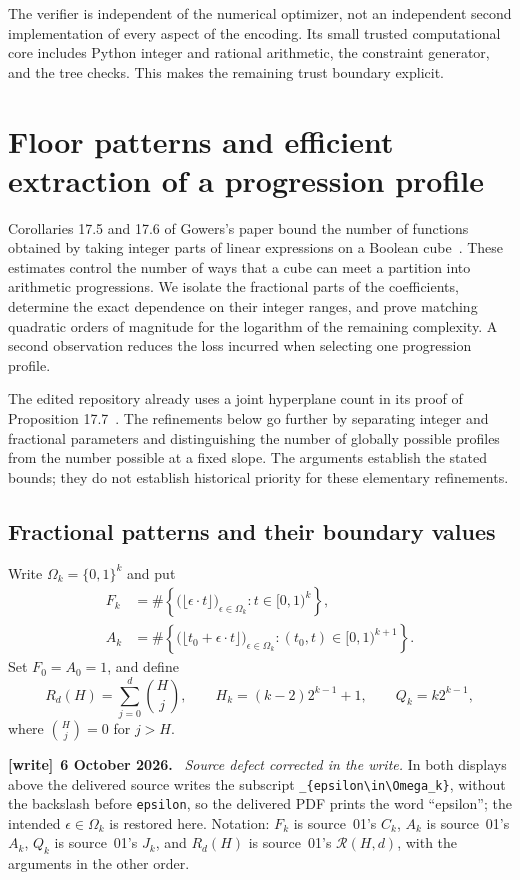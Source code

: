 \documentclass[11pt,letterpaper]{article}
\numberwithin{equation}{section}
\theoremstyle{definition}
\theoremstyle{remark}
\newcommand{\1}{\mathbf 1}
\newenvironment{writenote}[1][]{\par\smallskip\begingroup\small
 \noindent\textbf{[write]}\if\relax\detokenize{#1}\relax\else~\textbf{#1.}\fi\ }%
 {\par\endgroup\smallskip}
\newcommand{\srctag}[1]{\texorpdfstring{\enspace\textup{[#1]}}{ [#1]}}
\newcommand{\srcnote}[2]{\par\noindent{\small\textit{Source #1, delivered #2.}}\par}
\begin{document}
The verifier is independent of the numerical optimizer, not an independent
second implementation of every aspect of the encoding. Its small trusted
computational core includes Python integer and rational arithmetic, the
constraint generator, and the tree checks. This makes the remaining trust
boundary explicit.

\section[{Floor patterns and efficient extraction of a progression profile\srctag{04}}]{Floor patterns and efficient extraction of a progression profile}\label{gsr:fp:04:sec:d8}
\srcnote{04}{Section 8}
\label{gsr:fp:04:pat:section}

Corollaries 17.5 and 17.6 of Gowers's paper bound the number of functions
obtained by taking integer parts of linear expressions on a Boolean
cube~\cite{gowers}. These estimates control the number of ways that a
cube can meet a partition into arithmetic progressions. We isolate the
fractional parts of the coefficients, determine the exact dependence on
their integer ranges, and prove matching quadratic orders of magnitude
for the logarithm of the remaining complexity. A second observation
reduces the loss incurred when selecting one progression profile.

The edited repository already uses a joint hyperplane count in its proof
of Proposition 17.7~\cite{repo04}. The refinements below go further by
separating integer and fractional parameters and distinguishing the
number of globally possible profiles from the number possible at a fixed
slope. The arguments establish the stated bounds; they do not establish
historical priority for these elementary refinements.

\subsection{Fractional patterns and their boundary values}

Write $\Omega_k=\{0,1\}^k$ and put
\[
 \begin{split}
 F_k&=\#\left\{\bigl(\lfloor\epsilon\cdot t\rfloor\bigr)_{\epsilon\in\Omega_k}:
                  t\in[0,1)^k\right\},\\
 A_k&=\#\left\{\bigl(\lfloor t_0+\epsilon\cdot t\rfloor\bigr)_{\epsilon\in\Omega_k}:
                  (t_0,t)\in[0,1)^{k+1}\right\}.
 \end{split}
\]
Set $F_0=A_0=1$, and define
\[
 R_d(H)=\sum_{j=0}^d\binom Hj,
 \qquad H_k=(k-2)2^{k-1}+1,
 \qquad Q_k=k2^{k-1},
\]
where $\binom Hj=0$ for $j>H$.
\begin{writenote}[6 October 2026]
\emph{Source defect corrected in the write.} In both displays above the delivered source writes the subscript \texttt{\_\{epsilon\textbackslash in\textbackslash Omega\_k\}}, without the backslash before \texttt{epsilon}, so the delivered PDF prints the word ``epsilon''; the intended $\epsilon\in\Omega_k$ is restored here. Notation: $F_k$ is source~01's $C_k$, $A_k$ is source~01's $A_k$, $Q_k$ is source~01's $J_k$, and $R_d(H)$ is source~01's $\mathcal R(H,d)$, with the arguments in the other order.
\end{writenote}
\end{document}
